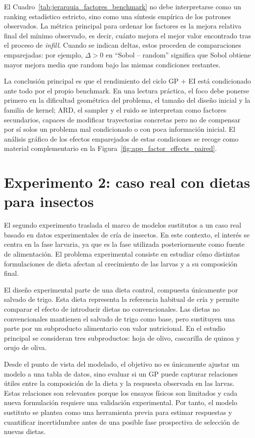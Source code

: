 El Cuadro~\ref{tab:jerarquia_factores_benchmark} no debe interpretarse como un ranking estadístico estricto, sino como una síntesis empírica de los patrones observados. La métrica principal para ordenar los factores es la mejora relativa final del mínimo observado, es decir, cuánto mejora el mejor valor encontrado tras el proceso de \emph{infill}. Cuando se indican deltas, estos proceden de comparaciones emparejadas: por ejemplo, \(\Delta>0\) en ``Sobol -- random'' significa que Sobol obtiene mayor mejora media que random bajo las mismas condiciones restantes.

La conclusión principal es que el rendimiento del ciclo GP + EI está condicionado ante todo por el propio benchmark. En una lectura práctica, el foco debe ponerse primero en la dificultad geométrica del problema, el tamaño del diseño inicial y la familia de kernel; ARD, el sampler y el ruido se interpretan como factores secundarios, capaces de modificar trayectorias concretas pero no de compensar por sí solos un problema mal condicionado o con poca información inicial. El análisis gráfico de los efectos emparejados de estas condiciones se recoge como material complementario en la Figura~\ref{fig:app_factor_effects_paired}.

\section{Experimento 2: caso real con dietas para insectos}\label{subsec:experimento_caso_real}

El segundo experimento traslada el marco de modelos sustitutos a un caso real basado en datos experimentales de cría de insectos. En este contexto, el interés se centra en la fase larvaria, ya que es la fase utilizada posteriormente como fuente de alimentación. El problema experimental consiste en estudiar cómo distintas formulaciones de dieta afectan al crecimiento de las larvas y a su composición final.

El diseño experimental parte de una dieta control, compuesta únicamente por salvado de trigo. Esta dieta representa la referencia habitual de cría y permite comparar el efecto de introducir dietas no convencionales. Las dietas no convencionales mantienen el salvado de trigo como base, pero sustituyen una parte por un subproducto alimentario con valor nutricional. En el estudio principal se consideran tres subproductos: hoja de olivo, cascarilla de quinoa y orujo de oliva.

Desde el punto de vista del modelado, el objetivo no es únicamente ajustar un modelo a una tabla de datos, sino evaluar si un GP puede capturar relaciones útiles entre la composición de la dieta y la respuesta observada en las larvas. Estas relaciones son relevantes porque los ensayos físicos son limitados y cada nueva formulación requiere una validación experimental. Por tanto, el modelo sustituto se plantea como una herramienta previa para estimar respuestas y cuantificar incertidumbre antes de una posible fase prospectiva de selección de nuevas dietas.

